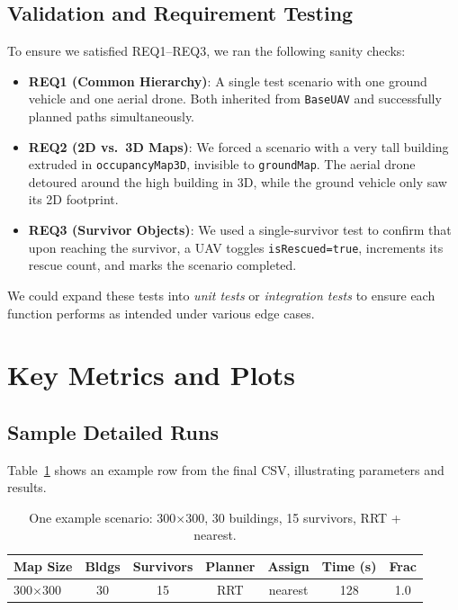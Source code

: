 \documentclass[12pt,a4paper]{report}
\begin{document}
\subsection*{Validation and Requirement Testing}
To ensure we satisfied REQ1–REQ3, we ran the following sanity checks:
\begin{itemize}
    \item \textbf{REQ1 (Common Hierarchy)}: A single test scenario with one ground vehicle
    and one aerial drone. Both inherited from \texttt{BaseUAV} and successfully planned
    paths simultaneously.
    \item \textbf{REQ2 (2D vs.\ 3D Maps)}: We forced a scenario with a very tall building
    extruded in \texttt{occupancyMap3D}, invisible to \texttt{groundMap}. The aerial drone
    detoured around the high building in 3D, while the ground vehicle only saw its 2D footprint.
    \item \textbf{REQ3 (Survivor Objects)}: We used a single-survivor test to confirm that
    upon reaching the survivor, a UAV toggles \texttt{isRescued=true}, increments its rescue
    count, and marks the scenario completed.
\end{itemize}
We could expand these tests into \emph{unit tests} or \emph{integration tests} to ensure
each function performs as intended under various edge cases.

\section{Key Metrics and Plots}
\label{sec:quant_results}

\subsection*{Sample Detailed Runs}
Table~\ref{tab:sampleRuns} shows an example row from the final CSV, illustrating parameters and results.

\begin{table}[H]
\centering
\caption{One example scenario: 300$\times$300, 30 buildings, 15 survivors, RRT + nearest.}
\label{tab:sampleRuns}
\begin{tabular}{lcccccc}
\hline
\textbf{Map Size} & \textbf{Bldgs} & \textbf{Survivors} & \textbf{Planner} & \textbf{Assign} & \textbf{Time (s)} & \textbf{Frac} \\
\hline
300$\times$300 & 30 & 15 & RRT  & nearest & 128 & 1.0 \\
\hline
\end{tabular}
\end{table}
\end{document}
